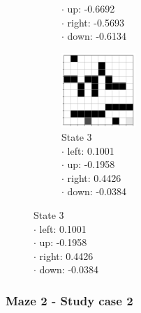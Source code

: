 \documentclass[a4paper]{article}    %
\begin{document}
\begin{figure}[H]
\begin{subfigure}{0.24\textwidth}
{            \hspace*{5mm} $\boldsymbol{\cdot}$ up:    -0.6692 \\
            \hspace*{5mm} $\boldsymbol{\cdot}$ right: -0.5693 \\
            \hspace*{5mm} $\boldsymbol{\cdot}$ down:  -0.6134 }
        \label{fig:maze2-case1-state2}
    \end{subfigure}
    \hfill
    \begin{subfigure}{0.24\textwidth}
        \centering
        \includegraphics[width=2.8cm]{maze2-case1-state3}
        \caption{State 3 \\
            \scriptsize
            \hspace*{5mm} $\boldsymbol{\cdot}$ left:   0.1001 \\
            \hspace*{5mm} $\boldsymbol{\cdot}$ up:    -0.1958 \\
            \hspace*{5mm} $\boldsymbol{\cdot}$ right:  0.4426 \\
            \hspace*{5mm} $\boldsymbol{\cdot}$ down:  -0.0384 }
        \label{fig:maze2-case1-state3}
    \end{subfigure}
\end{figure}

\subsubsection{Maze 2 - Study case 2}
\end{document}
